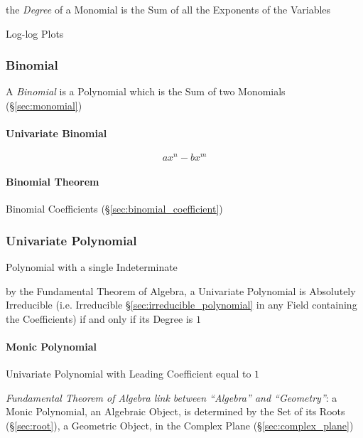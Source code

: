 the \emph{Degree} of a Monomial is the Sum of all the Exponents of the
Variables

Log-log Plots



\subsubsection{Binomial}\label{sec:binomial}

A \emph{Binomial} is a Polynomial which is the Sum of two Monomials
(\S\ref{sec:monomial})



\paragraph{Univariate Binomial}\label{sec:univariate_binomial}\hfill

\[
  a x^n - b x^m
\]


\paragraph{Binomial Theorem}\label{sec:binomial_theorem}\hfill

Binomial Coefficients (\S\ref{sec:binomial_coefficient})



\subsubsection{Univariate Polynomial}\label{sec:univariate_polynomial}

Polynomial with a single Indeterminate

by the Fundamental Theorem of Algebra, a Univariate Polynomial is Absolutely
Irreducible (i.e. Irreducible \S\ref{sec:irreducible_polynomial} in any Field
containing the Coefficients) if and only if its Degree is $1$



\paragraph{Monic Polynomial}\label{sec:monic_polynomial}\hfill

Univariate Polynomial with Leading Coefficient equal to $1$

\emph{Fundamental Theorem of Algebra link between ``Algebra'' and ``Geometry''}:
a Monic Polynomial, an Algebraic Object, is determined by the Set of its Roots
(\S\ref{sec:root}), a Geometric Object, in the Complex Plane
(\S\ref{sec:complex_plane})



